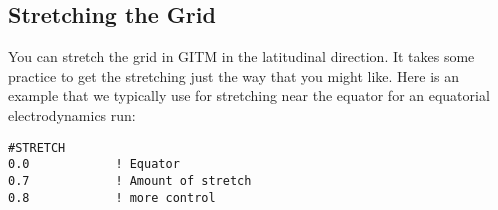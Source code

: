 \subsection{Stretching the Grid}

You can stretch the grid in GITM in the latitudinal direction.  It
takes some practice to get the stretching just the way that you might
like.  Here is an example that we typically use for stretching near
the equator for an equatorial electrodynamics run:
\begin{verbatim}
#STRETCH
0.0            ! Equator
0.7            ! Amount of stretch
0.8            ! more control
\end{verbatim}
